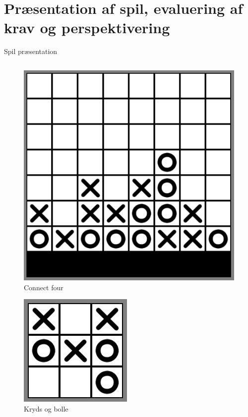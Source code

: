 \section{Præsentation af spil, evaluering af krav og perspektivering}

\begin{frame}{Spil præsentation}
\begin{columns}
	\begin{column}{.49\textwidth}
	\centering
		\begin{figure}[H]
   			\includegraphics[scale=0.18]{billeder/connect4.png}
   			\caption{Connect four}
		\end{figure}
	\hspace{0.3cm}
	\centering
		\begin{figure}[H]
   			\includegraphics[scale=0.28]{billeder/noughtncrosses.png}
   			\caption{Kryds og bolle}

\end{figure}
\end{column}
\end{columns}
\end{frame}

